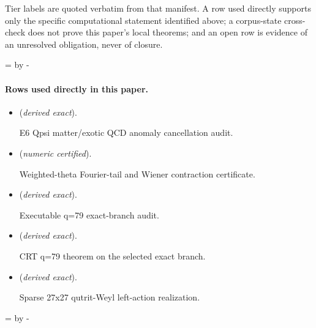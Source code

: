 \documentclass[11pt]{article}
\begin{document}
Tier labels are quoted verbatim from that manifest. A row used directly supports only the specific computational statement identified above; a corpus-state cross-check does not prove this paper's local theorems; and an open row is evidence of an unresolved obligation, never of closure.

\par\begingroup{}=\pagegoal\advance{} by -\pagetotal\ifdim\dimen0<7\baselineskip\newpage\fi\endgroup
\paragraph{Rows used directly in this paper.}
\begin{itemize}
\setlength{\itemsep}{0.25em}
\item {} (\emph{derived exact}).\par E6 Qpsi matter/exotic QCD anomaly cancellation audit.
\item {} (\emph{numeric certified}).\par Weighted-theta Fourier-tail and Wiener contraction certificate.
\item {} (\emph{derived exact}).\par Executable q=79 exact-branch audit.
\item {} (\emph{derived exact}).\par CRT q=79 theorem on the selected exact branch.
\item {} (\emph{derived exact}).\par Sparse 27x27 qutrit-Weyl left-action realization.
\end{itemize}

\par\begingroup{}=\pagegoal\advance{} by -\pagetotal\ifdim\dimen0<7\baselineskip\newpage\fi\endgroup
\end{document}
